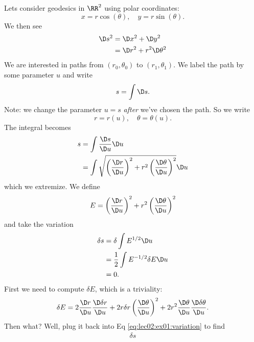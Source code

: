 \begin{ex}[$\RR^2$ revisited]
Lets consider geodesics in $\RR^2$ using polar coordinates:
\begin{equation}
x=r\cos(\theta),\quad y=r\sin(\theta).
\end{equation}
We then see
\begin{equation}
\begin{split}
\D s^2 &=\D x^2+\D y^2\\
&=\D r^2+r^2\D\theta^2
\end{split}
\end{equation}
We are interested in paths from $(r_0,\theta_0)$ to
$(r_1,\theta_1)$. We label the path by some parameter $u$ and
write
\begin{equation}
s=\int\D s.
\end{equation}
Note: we change the parameter $u=s$ \emph{after} we've chosen the
path. So we write
\begin{equation}
r=r(u),\quad\theta=\theta(u).
\end{equation}
The integral becomes
\begin{equation}
\begin{split}
s
&=\int\frac{\D s}{\D u}\D u\\
&=\int\sqrt{\left(\frac{\D r}{\D u}\right)^{2}+r^{2}\left(\frac{\D\theta}{\D u}\right)^{2}}\D u
\end{split}
\end{equation}
which we extremize. We define
\begin{equation}
E=\left(\frac{\D r}{\D u}\right)^{2}+r^{2}\left(\frac{\D\theta}{\D u}\right)^{2}
\end{equation}
and take the variation
\begin{equation}\label{eq:lec02:ex01:variation}
\begin{split}
\delta s
&=\delta\int E^{1/2}\D u\\
&=\frac{1}{2}\int E^{-1/2}\delta E\D u\\
&=0.
\end{split}
\end{equation}
First we need to compute $\delta E$, which is a triviality:
\begin{equation}
\delta E = 2\frac{\D r}{\D u}\frac{\D\delta r}{\D u}
+2r\delta r\left(\frac{\D\theta}{\D u}\right)^{2}
+2r^{2}\frac{\D\theta}{\D u}\frac{\D\delta\theta}{\D u}.
\end{equation}
Then what? Well, plug it back into Eq \eqref{eq:lec02:ex01:variation}
to find
\begin{align}
\delta s

\end{align}
\end{ex}
